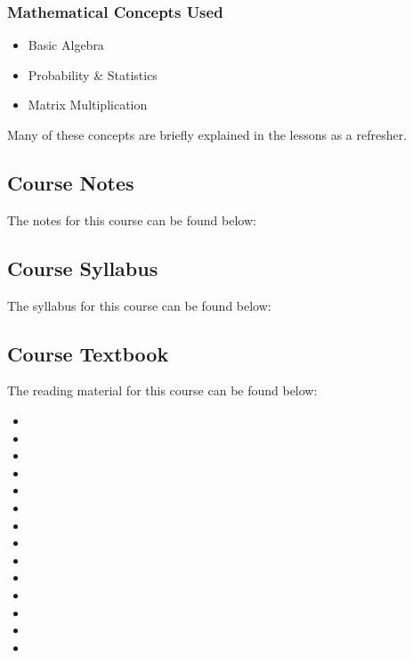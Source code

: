 {\begin{highlight}[\CSPBCogSci]
        \subsubsection*{Mathematical Concepts Used}
        
        \begin{itemize}
            \item Basic Algebra
            \item Probability \& Statistics
            \item Matrix Multiplication
        \end{itemize}
        Many of these concepts are briefly explained in the lessons as a refresher.
    \end{highlight}
}

\subsection{Course Notes}

The notes for this course can be found below: \coursedoc{\CSPBCogSciCourseNotes}

\subsection{Course Syllabus}

The syllabus for this course can be found below: \coursedoc{\CSPBCogSciSyllabus}

\subsection{Course Textbook}

The reading material for this course can be found below:

\begin{itemize}
    \item \CSPBCMAndIntel
    \item \CSPBEvol
    \item \CSPBExpInPsych
    \item \CSPBTitForTat
    \item \CSPBHeuristics
    \item \CSPBMentalImag
    \item \CSPBMindBody
    \item \CSPBMindsBrain
    \item \CSPBPixel
    \item \CSPBProsTheory
    \item \CSPBRecogProb
    \item \CSPBCollActions
    \item \CSPBNatMental
    \item \CSPBVision
\end{itemize}